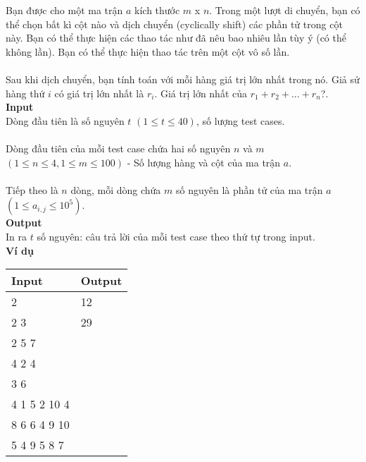 Bạn được cho một ma trận $a$ kích thước $m$ x $n$. Trong một lượt di chuyển, bạn có thể chọn bất kì cột nào và dịch chuyển (cyclically shift) các phần tử trong cột này. Bạn có thể thực hiện các thao tác như đã nêu bao nhiêu lần tùy ý (có thể không lần). Bạn có thể thực hiện thao tác trên một cột vô số lần. 
\\
\\
Sau khi dịch chuyển, bạn tính toán với mỗi hàng giá trị lớn nhất trong nó. Giả sử hàng thứ $i$ có giá trị lớn nhất là $r_{i}$. Giá trị lớn nhất của $r_{1} + r_{2} + ... + r_{n}$?.
\\

\textbf{Input}
\\
Dòng đầu tiên là số nguyên $t$ $(1 \leq t \leq 40)$, số lượng test cases.
\\
\\
Dòng đầu tiên của mỗi test case chứa hai số nguyên $n$ và $m$ $(1 \leq n \leq 4, 1 \leq m \leq 100)$ - Số lượng hàng và cột của ma trận $a$.
\\
\\
Tiếp theo là $n$ dòng, mỗi dòng chứa $m$ số nguyên là phần tử của ma trận $a$ $(1 \leq a_{i,j} \leq 10^{5})$.
\\

\textbf{Output}
\\
In ra $t$ số nguyên: câu trả lời của mỗi test case theo thứ tự trong input.
\\

\textbf{Ví dụ}
\begin{table}[h!]
    \begin{center}
        \begin{tabular}{|p{7cm}|p{5cm}|}
            \hline
            \textbf{Input} & \textbf{Output} \\ 
            \hline
            2 & 12 \\
            2 3 & 29\\
            2 5 7 & \\
            4 2 4 & \\
            3 6 & \\
            4 1 5 2 10 4  & \\
            8 6 6 4 9 10  & \\
            5 4 9 5 8 7 & \\
            \hline
        \end{tabular}
    \end{center}
\end{table}


